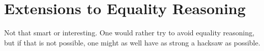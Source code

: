 \section{Extensions to Equality Reasoning}
Not that smart or interesting. One would rather try to avoid equality reasoning,
but if that is not possible, one might as well have as strong a hacksaw as
possible.

